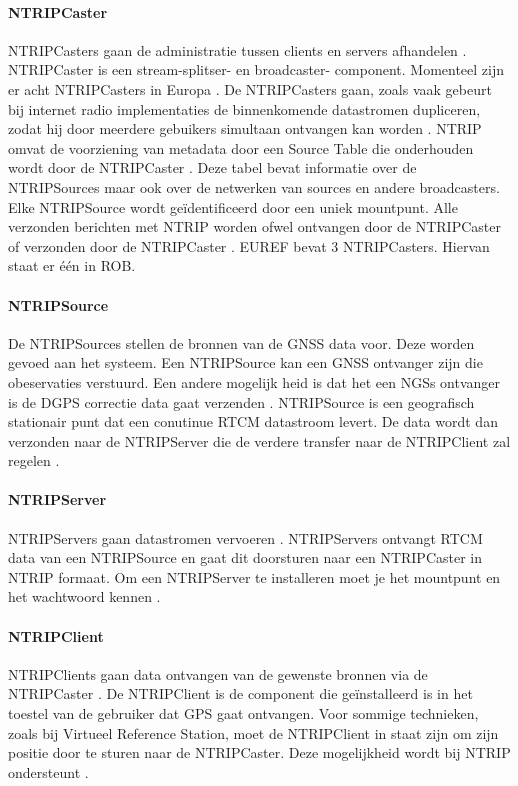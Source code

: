 \paragraph{NTRIPCaster}
 NTRIPCasters gaan de administratie tussen clients en servers afhandelen \cite{LBibGPS}. NTRIPCaster is een stream-splitser- en broadcaster- component. Momenteel zijn er acht NTRIPCasters in Europa \cite{LBibNTRIP}. De NTRIPCasters gaan, zoals vaak gebeurt bij internet radio implementaties de binnenkomende datastromen dupliceren, zodat hij door meerdere gebuikers simultaan ontvangen kan worden \cite{LBibNTRIP2}. NTRIP omvat de voorziening van metadata door een Source Table die onderhouden wordt door de NTRIPCaster \cite{LBibNTRIP3}. Deze tabel bevat informatie over de NTRIPSources maar ook over de netwerken van sources en andere broadcasters. Elke NTRIPSource wordt ge\"identificeerd door een uniek mountpunt. Alle verzonden berichten met NTRIP worden ofwel ontvangen door de NTRIPCaster of verzonden door de NTRIPCaster \cite{LBibNTRIP4}. EUREF bevat 3 NTRIPCasters. Hiervan staat er \'e\'en in ROB. 
 
\paragraph{NTRIPSource}
De NTRIPSources stellen de bronnen van de GNSS data voor. Deze worden gevoed aan het systeem. Een  NTRIPSource kan een GNSS ontvanger zijn die obeservaties verstuurd. Een andere mogelijk heid is dat het een NGSs ontvanger is de DGPS correctie data gaat verzenden \cite{LBibNTRIP3}. NTRIPSource is een geografisch stationair punt dat een conutinue RTCM datastroom levert. De data wordt dan verzonden naar de NTRIPServer die de verdere transfer naar de NTRIPClient zal regelen \cite{LBibNTRIP4}.

\paragraph{NTRIPServer}
NTRIPServers gaan datastromen vervoeren \cite{LBibGPS}. NTRIPServers ontvangt RTCM data van een NTRIPSource en gaat dit doorsturen naar een NTRIPCaster in NTRIP formaat. Om een NTRIPServer te installeren moet je het mountpunt en het wachtwoord kennen \cite{LBibNTRIP4}.
 
\paragraph{NTRIPClient}
NTRIPClients gaan data ontvangen van de gewenste bronnen via de NTRIPCaster \cite{LBibNTRIP}. De NTRIPClient is de component die ge\"installeerd is in het toestel van de gebruiker dat GPS gaat ontvangen. Voor sommige technieken, zoals bij Virtueel Reference Station, moet de NTRIPClient in staat zijn om zijn positie door te sturen naar de NTRIPCaster. Deze mogelijkheid wordt bij NTRIP ondersteunt \cite{LBibNTRIP4}.



